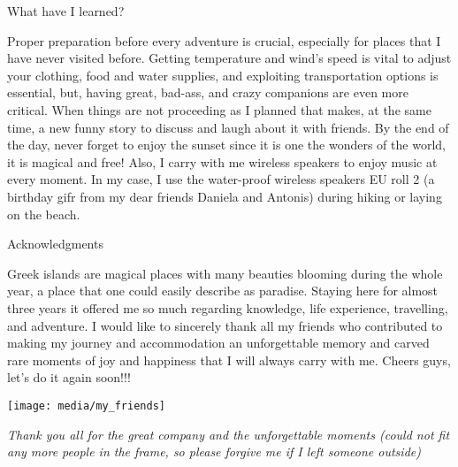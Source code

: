 \documentclass[10pt,a4paper]{article} %
\newcommand{\NewsItem}[1]{ %
\usefont{T1}{fvs}{n}{n} %
\vspace{24pt}\large #1\vspace{3pt} %
\par \normalsize \normalfont}
\begin{document}
\begin{multicols}{3}
\NewsItem{What have I learned?}
Proper preparation before every adventure is crucial,
especially for places that I have never visited before. 
Getting temperature and wind's speed is vital to adjust your clothing,
food and water supplies, and exploiting transportation options is essential,
but, having great, bad-ass, and crazy companions are even more critical. 
When things are not proceeding as I planned that makes, at the same time,
a new funny story to discuss and laugh about it with friends.     
By the end of the day, never forget to enjoy the sunset since it is one
the wonders of the world, it is magical and free! 
Also, I carry with me wireless speakers to enjoy music at every moment. 
In my case, I use the water-proof wireless speakers EU roll 2
(a birthday gifr from my dear friends Daniela and Antonis)
during hiking or laying on the beach. 

\NewsItem{Acknowledgments}
Greek islands are magical places with many beauties blooming during the whole year, 
a place that one could easily describe as paradise. 
Staying here for almost three years it offered me so much regarding knowledge,
life experience, travelling, and adventure. 
I would like to sincerely thank all my friends who contributed to making my journey
and accommodation an unforgettable memory and carved rare moments of joy
and happiness that I will always carry with me. 
Cheers guys, let's do it again soon!!!

\end{multicols}

\begin{center}
	\texttt{[image: media/my\_friends]}
	\par\textit{Thank you all for the great company and the unforgettable moments (could not fit any more people in the frame, so please forgive me if I left someone outside)}
\end{center}
\end{document}
